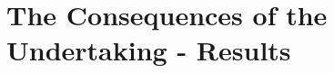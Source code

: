 \documentclass[british,11pt,a4paper]{memoir}
\begin{document}
\chapter{The Consequences of the Undertaking - Results}


% 
% 
% 
\end{document}

